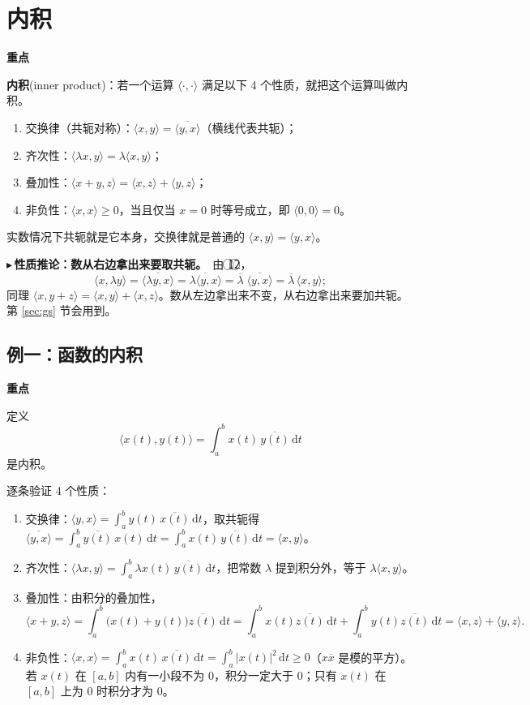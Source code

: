 \documentclass[UTF8,a4paper,11pt]{ctexart}
\newenvironment{remember}{\begin{rememberbox}\textbf{重点}\par\smallskip}{\end{rememberbox}}
\newcounter{ex}[section]
\newcommand{\point}[1]{\par\addvspace{1ex}\noindent\textcolor{ptteal}{$\blacktriangleright$\,\textbf{#1}}\ }
\begin{document}
\section{内积}\label{sec:ip}
\begin{remember}
\textbf{内积}(inner product)：若一个运算 $\langle\cdot,\cdot\rangle$ 满足以下 4 个性质，就把这个运算叫做内积。
\begin{enumerate}[nosep,label=\textcircled{\scriptsize\arabic*}]
\item 交换律（共轭对称）：$\langle x,y\rangle=\overline{\langle y,x\rangle}$（横线代表共轭）；
\item 齐次性：$\langle\lambda x,y\rangle=\lambda\langle x,y\rangle$；
\item 叠加性：$\langle x+y,z\rangle=\langle x,z\rangle+\langle y,z\rangle$；
\item 非负性：$\langle x,x\rangle\ge0$，当且仅当 $x=0$ 时等号成立，即 $\langle0,0\rangle=0$。
\end{enumerate}
\end{remember}
实数情况下共轭就是它本身，交换律就是普通的 $\langle x,y\rangle=\langle y,x\rangle$。

\point{性质推论：数从右边拿出来要取共轭。}由 \textcircled{\scriptsize 1}\textcircled{\scriptsize 2}，
\[
\langle x,\lambda y\rangle=\overline{\langle\lambda y,x\rangle}=\overline{\lambda\langle y,x\rangle}=\overline{\lambda}\;\overline{\langle y,x\rangle}=\overline{\lambda}\,\langle x,y\rangle ;
\]
同理 $\langle x,y+z\rangle=\langle x,y\rangle+\langle x,z\rangle$。数从左边拿出来不变，从右边拿出来要加共轭。第 \ref{sec:gs} 节会用到。

\subsection{例一：函数的内积}
\begin{remember}
定义
\[
\langle x(t),y(t)\rangle=\int_a^b x(t)\,\overline{y(t)}\,\mathrm{d}t
\]
是内积。
\end{remember}
逐条验证 4 个性质：
\begin{enumerate}[nosep,label=\textcircled{\scriptsize\arabic*}]
\item 交换律：$\langle y,x\rangle=\int_a^b y(t)\,\overline{x(t)}\,\mathrm{d}t$，取共轭得 $\overline{\langle y,x\rangle}=\int_a^b\overline{y(t)}\,x(t)\,\mathrm{d}t=\int_a^b x(t)\,\overline{y(t)}\,\mathrm{d}t=\langle x,y\rangle$。
\item 齐次性：$\langle\lambda x,y\rangle=\int_a^b\lambda x(t)\,\overline{y(t)}\,\mathrm{d}t$，把常数 $\lambda$ 提到积分外，等于 $\lambda\langle x,y\rangle$。
\item 叠加性：由积分的叠加性，
\[
\langle x+y,z\rangle=\int_a^b\big(x(t)+y(t)\big)\overline{z(t)}\,\mathrm{d}t=\int_a^b x(t)\overline{z(t)}\,\mathrm{d}t+\int_a^b y(t)\overline{z(t)}\,\mathrm{d}t=\langle x,z\rangle+\langle y,z\rangle .
\]
\item 非负性：$\langle x,x\rangle=\int_a^b x(t)\,\overline{x(t)}\,\mathrm{d}t=\int_a^b|x(t)|^2\,\mathrm{d}t\ge0$（$x\overline{x}$ 是模的平方）。若 $x(t)$ 在 $[a,b]$ 内有一小段不为 $0$，积分一定大于 $0$；只有 $x(t)$ 在 $[a,b]$ 上为 $0$ 时积分才为 $0$。
\end{enumerate}
\end{document}
